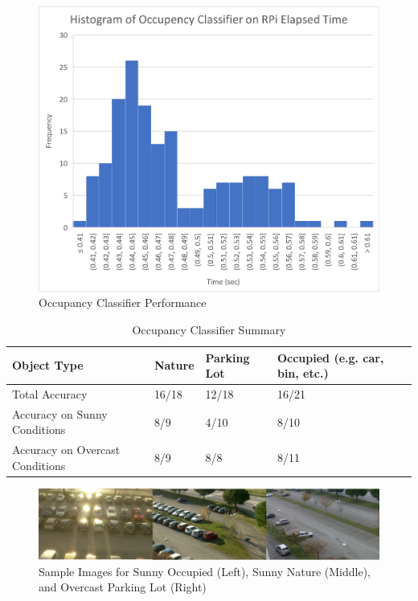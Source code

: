 \documentclass[12pt, titlepage]{article}
\begin{document}
\begin{figure}[h!]
  \begin{center} 
  \caption{Occupancy Classifier Performance}
  \label{fig:occClassifierPerf}
        \includegraphics[width=1\textwidth]{VnVReport/OccupencyClassifierPerformance.png}
  \end{center}
\end{figure}


\begin{table}[!h]
\begin{center}
\caption {Occupancy Classifier Summary}
\label{tab:OccClassifierSummary}
\begin{tabular}{ | m{5cm} | m{3cm} | m{3cm} | m{3cm} | } 
\hline
Object Type & Nature & Parking Lot & Occupied (e.g. car, bin, etc.) \\ 
\hline
Total Accuracy & 16/18 & 12/18 & 16/21 \\
\hline
Accuracy on Sunny Conditions & 8/9 & 4/10 & 8/10 \\
\hline
Accuracy on Overcast Conditions & 8/9 & 8/8 & 8/11 \\
\hline
\end{tabular}
\end{center}
\end{table}

\begin{figure}[h!]
  \begin{center} 
  \caption{Sample Images for Sunny Occupied (Left), Sunny Nature (Middle), and Overcast Parking Lot (Right)}
  \label{fig:sampleImages}
        \includegraphics[width=1\textwidth]{VnVReport/SampleImages.png}
  \end{center}
\end{figure}
\end{document}
